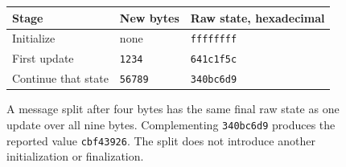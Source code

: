 \begin{figure}[htbp]
  \centering
  \begin{tabular}{l l l}
    \toprule
    Stage               & New bytes      & Raw state, hexadecimal \\
    \midrule
    Initialize          & none           & \texttt{ffffffff}      \\
    First update        & \texttt{1234}  & \texttt{641c1f5c}      \\
    Continue that state & \texttt{56789} & \texttt{340bc6d9}      \\
    \bottomrule
  \end{tabular}
  \caption{A message split after four bytes has the same final raw state as one update over all nine bytes. Complementing \texttt{340bc6d9} produces the reported value \texttt{cbf43926}. The split does not introduce another initialization or finalization.}
  \label{fig:revision-crc-stream-state}
\end{figure}
